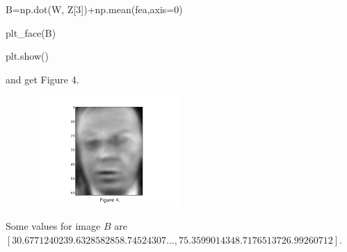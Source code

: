 \documentclass[leqno]{article}
\begin{document}
\noindent B=np.dot(W, Z[3])+np.mean(fea,axis=0)

\noindent plt\_face(B)

\noindent plt.show()

\noindent and get Figure 4.

\begin{figure}[h!]
\includegraphics[width=0.5\textwidth]{figure_5d2}  
\end{figure}

\noindent Some values for image $B$ are $[ 30.67712402  39.63285828  58.74524307 ...,  75.35990143  48.71765137 26.99260712]$.
\end{document}
